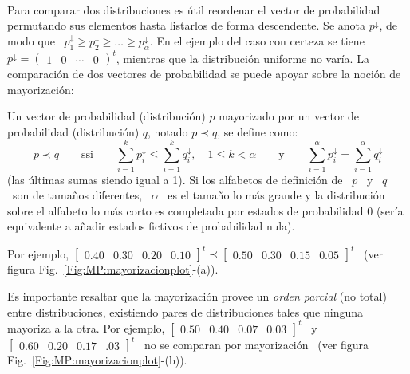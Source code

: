 \

Para comparar dos  distribuciones es \'util reordenar el  vector de probabilidad
permutando  sus  elementos  hasta  listarlos  de forma  descendente.   Se  anota
$p^\downarrow$, de modo que \  $p^\downarrow_1 \ge p^\downarrow_2 \ge \ldots \ge
p^\downarrow_\alpha$.  En  el ejemplo del caso  con certeza se  tiene \ $p^\downarrow
=  \begin{pmatrix}  1  & 0  &  \cdots  &  0  \end{pmatrix}^t$, mientras  que  la
distribuci\'on  uniforme  no  var\'ia.  La  comparaci\'on  de  dos  vectores  de
probabilidad se puede apoyar sobre la noci\'on de mayorizaci\'on:
%
\begin{definicion}[Mayorizaci\'on]
\label{Def:MP:Mayorizacion}
%
  Un vector  de probabilidad  (distribuci\'on) $p$ mayorizado  por un  vector de
  probabilidad (distribuci\'on) $q$, notado $p \prec q$, se define como:
  \[
  p   \prec  q   \qquad  \mbox{ssi}   \qquad  \sum_{i=1}^k   p_i^\downarrow  \le
  \sum_{i=1}^k q_i^\downarrow,  \quad 1  \le k <  \alpha \qquad  \mbox{y} \qquad
  \sum_{i=1}^\alpha p_i^\downarrow = \sum_{i=1}^\alpha q_i^\downarrow
  \]
  (las \'ultimas sumas siendo igual a 1).  Si los alfabetos de definici\'on de \
  $p$ \ y  \ $q$ \ son de  tama\~nos diferentes, \ $\alpha$ \ es  el tama\~no lo
  m\'as  grande  y  la  distribuci\'on  sobre  el alfabeto  lo  m\'as  corto  es
  completada  por estados  de  probabilidad 0  (ser\'ia  equivalente a  a\~nadir
  estados fictivos de probabilidad nula).
\end{definicion}
%
\noindent   Por    ejemplo,   $\begin{bmatrix}   0.40   &   0.30    &   0.20   &
  0.10   \end{bmatrix}^t  \prec   \begin{bmatrix}   0.50  &   0.30   &  0.15   &
  0.05 \end{bmatrix}^t$ \ (ver figura Fig.~\ref{Fig:MP:mayorizacionplot}-(a)).

Es importante resaltar  que la mayorizaci\'on provee un  {\em orden parcial} (no
total)  entre  distribuciones,  existiendo  pares de  distribuciones  tales  que
ninguna mayoriza a la otra.  Por  ejemplo, $\begin{bmatrix} 0.50 & 0.40 & 0.07 &
  0.03  \end{bmatrix}^t$  \   y  \  $\begin{bmatrix}  0.60  &   0.20  &  0.17  &
  .03  \end{bmatrix}^t$  \ no  se  comparan  por  mayorizaci\'on \  (ver  figura
Fig.~\ref{Fig:MP:mayorizacionplot}-(b)).

